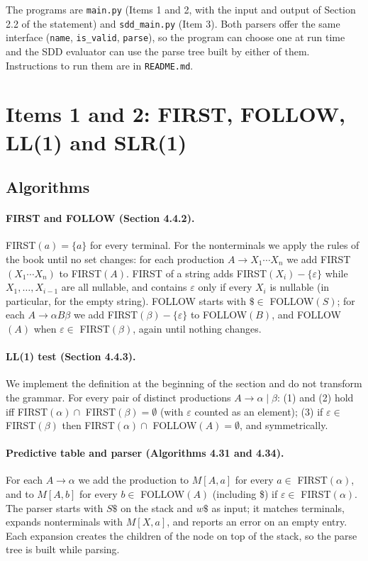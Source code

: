 \documentclass[11pt]{article}
\begin{document}
The programs are \texttt{main.py} (Items 1 and 2, with the input and output of
Section 2.2 of the statement) and \texttt{sdd\_main.py} (Item 3). Both parsers
offer the same interface (\texttt{name}, \texttt{is\_valid}, \texttt{parse}),
so the program can choose one at run time and the SDD evaluator can use the
parse tree built by either of them. Instructions to run them are in
\texttt{README.md}.

\section{Items 1 and 2: FIRST, FOLLOW, LL(1) and SLR(1)}

\subsection{Algorithms}

\paragraph{FIRST and FOLLOW (Section 4.4.2).}
FIRST$(a) = \{a\}$ for every terminal. For the nonterminals we apply the rules
of the book until no set changes: for each production $A \to X_1 \cdots X_n$
we add FIRST$(X_1 \cdots X_n)$ to FIRST$(A)$. FIRST of a string adds
FIRST$(X_i) - \{\varepsilon\}$ while $X_1, \ldots, X_{i-1}$ are all nullable,
and contains $\varepsilon$ only if every $X_i$ is nullable (in particular, for
the empty string). FOLLOW starts with $\$ \in$ FOLLOW$(S)$; for each
$A \to \alpha B \beta$ we add FIRST$(\beta) - \{\varepsilon\}$ to FOLLOW$(B)$,
and FOLLOW$(A)$ when $\varepsilon \in$ FIRST$(\beta)$, again until nothing
changes.

\paragraph{LL(1) test (Section 4.4.3).}
We implement the definition at the beginning of the section and do not
transform the grammar. For every pair of distinct productions
$A \to \alpha \mid \beta$: (1) and (2) hold iff
FIRST$(\alpha) \cap$ FIRST$(\beta) = \emptyset$ (with $\varepsilon$ counted
as an element); (3) if $\varepsilon \in$ FIRST$(\beta)$ then
FIRST$(\alpha) \cap$ FOLLOW$(A) = \emptyset$, and symmetrically.

\paragraph{Predictive table and parser (Algorithms 4.31 and 4.34).}
For each $A \to \alpha$ we add the production to $M[A, a]$ for every
$a \in$ FIRST$(\alpha)$, and to $M[A, b]$ for every $b \in$ FOLLOW$(A)$
(including \$) if $\varepsilon \in$ FIRST$(\alpha)$. The parser starts with
$S\$$ on the stack and $w\$$ as input; it matches terminals, expands
nonterminals with $M[X, a]$, and reports an error on an empty entry. Each
expansion creates the children of the node on top of the stack, so the parse
tree is built while parsing.
\end{document}
